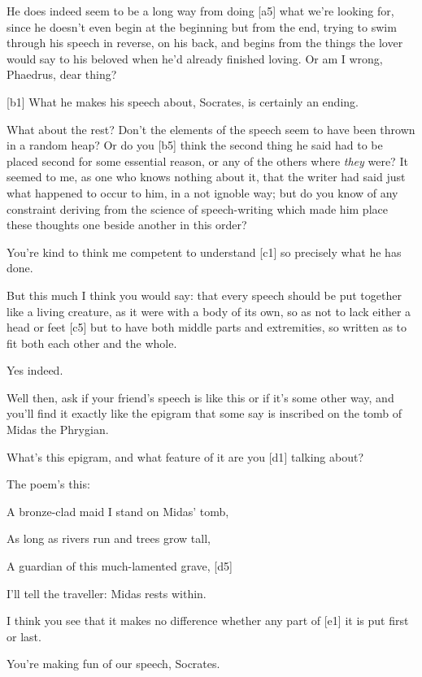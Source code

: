  He does indeed seem to be a long way from doing {[}a5{]} what
we're looking for, since he doesn't even begin at the beginning but from
the end, trying to swim through his speech in reverse, on his back, and
begins from the things the lover would say to his beloved when he'd
already finished loving. Or am I wrong, Phaedrus, dear
thing?

{[}b1{]}  What he makes his speech about, Socrates, is certainly
an ending.

 What about the rest? Don't the elements of the speech seem to
have been thrown in a random heap? Or do you {[}b5{]} think the second
thing he said had to be placed second for some essential reason, or any
of the others where {\em they} were? It seemed to me, as one who knows
nothing about it, that the writer had said just what happened to occur
to him, in a not ignoble way; but do you know of any constraint deriving
from the science of speech-writing which made him place these thoughts
one beside another in this order?

 You're kind to think me competent to understand {[}c1{]} so
precisely what he has done.

 But this much I think you would say: that every speech should
be put together like a living creature, as it were with a body of its
own, so as not to lack either a head or feet {[}c5{]} but to have both
middle parts and extremities, so written as to fit both each other and
the whole.

 Yes indeed.

 Well then, ask if your friend's speech is like this or if it's
some other way, and you'll find it exactly like the epigram that some
say is inscribed on the tomb of Midas the
Phrygian.

 What's this epigram, and what feature of it are you {[}d1{]}
talking about?

 The poem's this:

A bronze-clad maid I stand on Midas' tomb,

As long as rivers run and trees grow tall,

A guardian of this much-lamented grave, {[}d5{]}

I'll tell the traveller: Midas rests within.

I think you see that it makes no difference whether any part of {[}e1{]}
it is put first or last.

 You're making fun of our speech, Socrates.

